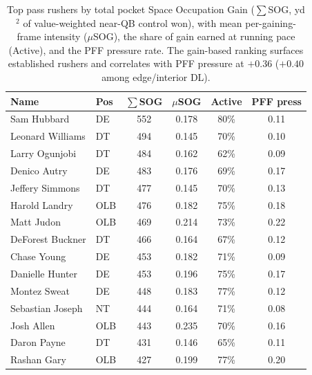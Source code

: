 \begin{table}[h!]
\centering
\footnotesize
\begin{tabular}{llcccc}
\toprule
Name & Pos & $\sum$SOG & $\mu$SOG & Active & PFF press \\
\midrule
Sam Hubbard & DE & 552 & 0.178 & 80\% & 0.11 \\
Leonard Williams & DT & 494 & 0.145 & 70\% & 0.10 \\
Larry Ogunjobi & DT & 484 & 0.162 & 62\% & 0.09 \\
Denico Autry & DE & 483 & 0.176 & 69\% & 0.17 \\
Jeffery Simmons & DT & 477 & 0.145 & 70\% & 0.13 \\
Harold Landry & OLB & 476 & 0.182 & 75\% & 0.18 \\
Matt Judon & OLB & 469 & 0.214 & 73\% & 0.22 \\
DeForest Buckner & DT & 466 & 0.164 & 67\% & 0.12 \\
Chase Young & DE & 453 & 0.182 & 71\% & 0.09 \\
Danielle Hunter & DE & 453 & 0.196 & 75\% & 0.17 \\
Montez Sweat & DE & 448 & 0.183 & 77\% & 0.12 \\
Sebastian Joseph & NT & 444 & 0.164 & 71\% & 0.08 \\
Josh Allen & OLB & 443 & 0.235 & 70\% & 0.16 \\
Daron Payne & DT & 431 & 0.146 & 65\% & 0.11 \\
Rashan Gary & OLB & 427 & 0.199 & 77\% & 0.20 \\
\bottomrule
\end{tabular}
\caption{Top pass rushers by total pocket Space Occupation Gain ($\sum$SOG, yd$^2$ of value-weighted near-QB control won), with mean per-gaining-frame intensity ($\mu$SOG), the share of gain earned at running pace (Active), and the PFF pressure rate. The gain-based ranking surfaces established rushers and correlates with PFF pressure at $+0.36$ ($+0.40$ among edge/interior DL).}
\label{tab:pocket_sog_rusher}
\end{table}

